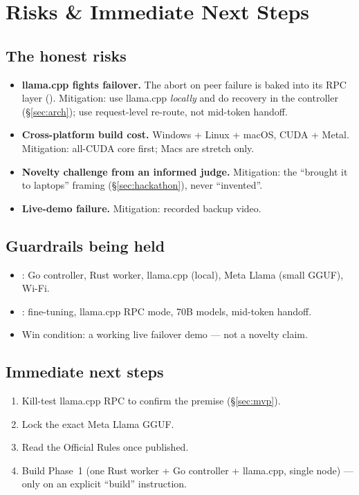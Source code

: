 \section{Risks \& Immediate Next Steps}
\label{sec:risks}

\subsection{The honest risks}
\begin{itemize}[leftmargin=1.4em,nosep]
  \item \textbf{llama.cpp fights failover.} The abort on peer failure is baked
  into its RPC layer (\VER). Mitigation: use llama.cpp \emph{locally} and do
  recovery in the controller (\S\ref{sec:arch}); use request-level re-route, not
  mid-token handoff.
  \item \textbf{Cross-platform build cost.} Windows + Linux + macOS, CUDA +
  Metal. Mitigation: all-CUDA core first; Macs are stretch only. \HYP
  \item \textbf{Novelty challenge from an informed judge.} Mitigation: the
  ``brought it to laptops'' framing (\S\ref{sec:hackathon}), never ``invented''.
  \item \textbf{Live-demo failure.} Mitigation: recorded backup video.
\end{itemize}

\subsection{Guardrails being held}
\begin{itemize}[leftmargin=1.4em,nosep]
  \item \Keep: Go controller, Rust worker, llama.cpp (local), Meta Llama (small
  GGUF), Wi-Fi.
  \item \Drop: fine-tuning, llama.cpp RPC mode, 70B models, mid-token handoff.
  \item Win condition: a working live failover demo --- not a novelty claim.
\end{itemize}

\subsection{Immediate next steps}
\begin{enumerate}[leftmargin=1.6em,nosep]
  \item Kill-test llama.cpp RPC to confirm the premise (\S\ref{sec:mvp}).
  \item Lock the exact Meta Llama GGUF.
  \item Read the Official Rules once published.
  \item Build Phase~1 (one Rust worker + Go controller + llama.cpp, single node)
  --- only on an explicit ``build'' instruction.
\end{enumerate}

